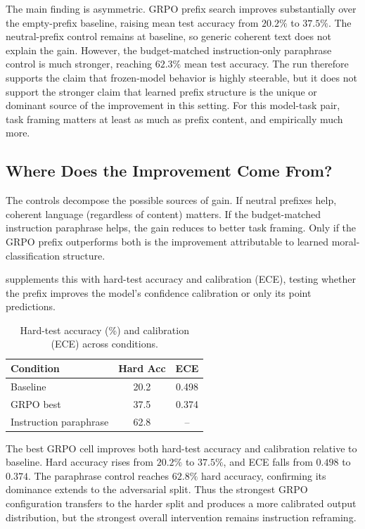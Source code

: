 \documentclass[preprint]{article}
\begin{document}
The main finding is asymmetric.
GRPO prefix search improves substantially over the empty-prefix baseline, raising mean test accuracy from $20.2\%$ to $37.5\%$.
The neutral-prefix control remains at baseline, so generic coherent text does not explain the gain.
However, the budget-matched instruction-only paraphrase control is much stronger, reaching $62.3\%$ mean test accuracy.
The run therefore supports the claim that frozen-model behavior is highly steerable, but it does not support the stronger claim that learned prefix structure is the unique or dominant source of the improvement in this setting.
For this model-task pair, task framing matters at least as much as prefix content, and empirically much more.

\subsection{Where Does the Improvement Come From?}
\label{sec:where_from}

The controls decompose the possible sources of gain.
If neutral prefixes help, coherent language (regardless of content) matters.
If the budget-matched instruction paraphrase helps, the gain reduces to better task framing.
Only if the GRPO prefix outperforms both is the improvement attributable to learned moral-classification structure.

 supplements this with hard-test accuracy and calibration (ECE), testing whether the prefix improves the model's confidence calibration or only its point predictions.

\begin{table}[t]
\centering
\caption{Hard-test accuracy (\%) and calibration (ECE) across conditions.}
\label{tab:hard_calibration}
\small
\begin{tabular}{lcc}
\toprule
Condition & Hard Acc & ECE \\
\midrule
Baseline & 20.2 & 0.498 \\
GRPO best & 37.5 & 0.374 \\
Instruction paraphrase & 62.8 & -- \\
\bottomrule
\end{tabular}
\end{table}

The best GRPO cell improves both hard-test accuracy and calibration relative to baseline.
Hard accuracy rises from $20.2\%$ to $37.5\%$, and ECE falls from $0.498$ to $0.374$.
The paraphrase control reaches $62.8\%$ hard accuracy, confirming its dominance extends to the adversarial split.
Thus the strongest GRPO configuration transfers to the harder split and produces a more calibrated output distribution, but the strongest overall intervention remains instruction reframing.
\end{document}
